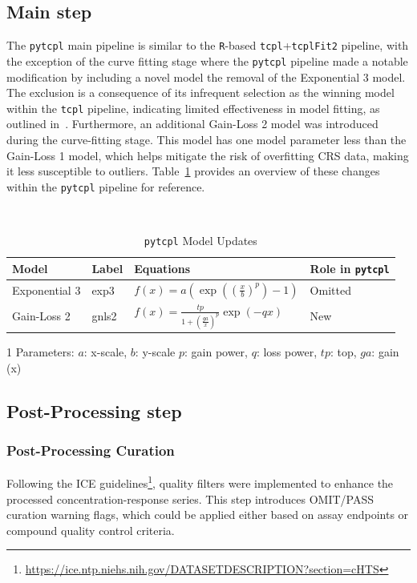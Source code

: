\subsection{Main step}
The \texttt{pytcpl} main pipeline is similar to the \texttt{R}-based \texttt{tcpl}+\texttt{tcplFit2} pipeline, with the exception of the curve fitting stage where the \texttt{pytcpl} pipeline made a notable modification by including a novel model the removal of the Exponential 3 model. The exclusion is a consequence of its infrequent selection as the winning model within the \texttt{tcpl} pipeline, indicating limited effectiveness in model fitting, as outlined in~\cite{feshuk2023}. Furthermore, an additional Gain-Loss 2 model was introduced during the curve-fitting stage. This model has one model parameter less than the Gain-Loss 1 model, which helps mitigate the risk of overfitting CRS data, making it less susceptible to outliers. Table~\ref{table:pytcpl_models} provides an overview of these changes within the \texttt{pytcpl} pipeline for reference.

\begin{table}
    \caption{\texttt{pytcpl} Model Updates}~\label{table:pytcpl_models}
    \centering
    \begin{threeparttable}[b]
    \begin{tabular}{llll}
    \toprule
    \textbf{Model} & \textbf{Label} & \textbf{Equations\tnote{1}} & \textbf{Role in} \texttt{pytcpl} \\
    \midrule
    Exponential 3 & exp3 & \(f(x) = a\left(\exp\left({\left(\frac{x}{b}\right)}^{p}\right) - 1\right)\) & Omitted \\
    Gain-Loss 2 & gnls2 & \(f(x) = \frac{tp}{1 + {\left(\frac{ga}{x}\right)}^{p}}\exp\left({-qx}\right)\) & New \\
    \bottomrule
    \end{tabular}
    \begin{tablenotes}
        \item [1] Parameters: $a$: x-scale, $b$: y-scale $p$: gain power, $q$: loss power, $tp$: top, $ga$: gain (x)
    \end{tablenotes}
\end{threeparttable}
\end{table}

\subsection{Post-Processing step}
\subsubsection{Post-Processing Curation}
Following the ICE guidelines\footnote{\url{https://ice.ntp.niehs.nih.gov/DATASETDESCRIPTION?section=cHTS}}, quality filters were implemented to enhance the processed concentration-response series. This step introduces OMIT/PASS curation warning flags, which could be applied either based on assay endpoints or compound quality control criteria.

